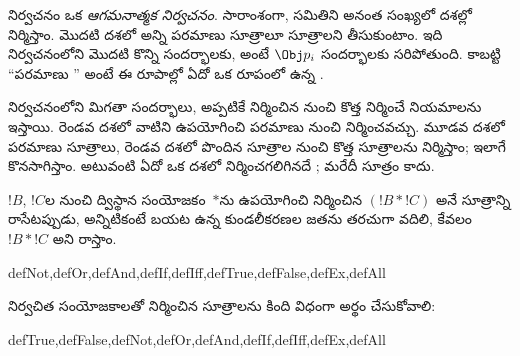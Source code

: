 \documentclass[../../../include/open-logic-section]{subfiles}
\begin{document}
\begin{explain}
 నిర్వచనం ఒక \emph{ఆగమనాత్మక నిర్వచనం}. సారాంశంగా,
 సమితిని అనంత సంఖ్యలో దశల్లో నిర్మిస్తాం. మొదటి దశలో అన్ని
పరమాణు సూత్రాలూ సూత్రాలని తీసుకుంటాం. ఇది నిర్వచనంలోని మొదటి కొన్ని
సందర్భాలకు, అంటే
%
%
$\Obj p_i$ సందర్భాలకు సరిపోతుంది. కాబట్టి “పరమాణు ”
అంటే ఈ రూపాల్లో ఏదో ఒక రూపంలో ఉన్న .

నిర్వచనంలోని మిగతా సందర్భాలు, అప్పటికే నిర్మించిన 
నుంచి కొత్త  నిర్మించే నియమాలను ఇస్తాయి. రెండవ దశలో
వాటిని ఉపయోగించి పరమాణు  నుంచి 
నిర్మించవచ్చు. మూడవ దశలో పరమాణు సూత్రాలు, రెండవ దశలో పొందిన
సూత్రాల నుంచి కొత్త సూత్రాలను నిర్మిస్తాం; ఇలాగే కొనసాగిస్తాం.
అటువంటి ఏదో ఒక దశలో నిర్మించగలిగినదే ; మరేదీ
సూత్రం కాదు.
\end{explain}

$!B$, $!C$ల నుంచి ద్విస్థాన సంయోజకం~$\ast$ను ఉపయోగించి నిర్మించిన
$(!B \ast !C)$ అనే సూత్రాన్ని రాసేటప్పుడు, అన్నిటికంటే బయట ఉన్న
కుండలీకరణల జతను తరచుగా వదిలి, కేవలం~$!B \ast !C$ అని రాస్తాం.

\begin{tagblock}{defNot,defOr,defAnd,defIf,defIff,defTrue,defFalse,defEx,defAll}
\begin{defn}
నిర్వచిత సంయోజకాలతో నిర్మించిన సూత్రాలను కింది విధంగా అర్థం
చేసుకోవాలి:

\begin{tagenumerate}{defTrue,defFalse,defNot,defOr,defAnd,defIf,defIff,defEx,defAll}







\end{tagenumerate}
\end{defn}
\end{tagblock}
\end{document}
